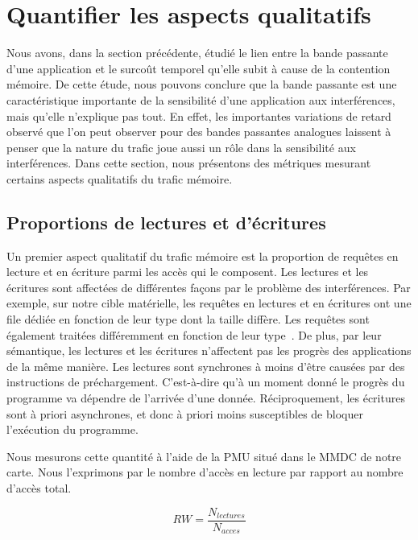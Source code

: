 \section{\label{section:qualitative}Quantifier les aspects qualitatifs}

Nous avons, dans la section précédente, étudié le lien entre la bande passante d'une application et le surcoût temporel qu'elle subit à cause de la contention mémoire.
De cette étude, nous pouvons conclure que la bande passante est une caractéristique importante de la sensibilité d'une application aux interférences, mais qu'elle n'explique pas tout.
En effet, les importantes variations de retard observé que l'on peut observer pour des bandes passantes analogues laissent à penser que la nature du trafic joue aussi un rôle dans la sensibilité aux interférences.
Dans cette section, nous présentons des métriques mesurant certains aspects qualitatifs du trafic mémoire.

\subsection{\label{subsection:rw}Proportions de lectures et d'écritures}

Un premier aspect qualitatif du trafic mémoire est la proportion de requêtes en lecture et en écriture parmi les accès qui le composent.
Les lectures et les écritures sont affectées de différentes façons par le problème des interférences.
Par exemple, sur notre cible matérielle, les requêtes en lectures et en écritures ont une file dédiée en fonction de leur type dont la taille diffère.
Les requêtes sont également traitées différemment en fonction de leur type~\cite{mmdc_flow}.
De plus, par leur sémantique, les lectures et les écritures n'affectent pas les progrès des applications de la même manière.
Les lectures sont synchrones à moins d'être causées par des instructions de préchargement.
C'est-à-dire qu'à un moment donné le progrès du programme va dépendre de l'arrivée d'une donnée.
Réciproquement, les écritures sont à priori asynchrones, et donc à priori moins susceptibles de bloquer l'exécution du programme.

Nous mesurons cette quantité à l'aide de la PMU situé dans le MMDC de notre carte. Nous l'exprimons par le nombre d'accès en lecture par rapport au nombre d'accès total.

$$RW = \frac{N_{lectures}}{N_{acces}}$$



